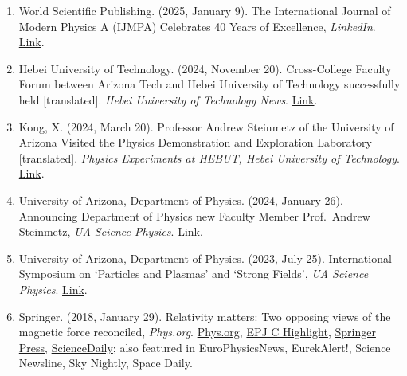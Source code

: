 \documentclass[11pt]{article}
\begin{document}
\begin{enumerate}[leftmargin=*,nosep]
  \item World Scientific Publishing. (2025, January 9). The International Journal of Modern Physics A (IJMPA) Celebrates 40 Years of Excellence, \textit{LinkedIn}. \href{https://www.linkedin.com/posts/world-scientific-publishing_the-international-journal-of-modern-physics-activity-7282999555967610880-SJ78}{Link}.
  \item Hebei University of Technology. (2024, November 20). Cross-College Faculty Forum between Arizona Tech and Hebei University of Technology successfully held [translated]. \textit{Hebei University of Technology News}. \href{https://web.archive.org/web/20250628230434/https://hatech.hebut.edu.cn/xw/62ff3dcc665b453898ec92841d45e0ce.htm}{Link}.
  \item Kong, X. (2024, March 20). Professor Andrew Steinmetz of the University of Arizona Visited the Physics Demonstration and Exploration Laboratory [translated]. \textit{Physics Experiments at HEBUT, Hebei University of Technology}. \href{https://web.archive.org/web/20250629152037/https://mp.weixin.qq.com/s?__biz=Mzg4Njg3NjQyMw==&mid=2247484302&idx=1&sn=273f88bc0332d9a34a9fdbee01b196b3&chksm=cf93b3e6f8e43af0b75b832801bbe9e684d258f00c3671e7e625bfccde7c74a387ef9e5a9926&mpshare=1&scene=24&srcid=0320Wt3iZMGOxbLpRBZg9nYA}{Link}.
  \item University of Arizona, Department of Physics. (2024, January 26). Announcing Department of Physics new Faculty Member Prof.\ Andrew Steinmetz, \textit{UA Science Physics}. \href{https://w3.physics.arizona.edu/news/announcing-department-physics-new-faculty-member-prof-andrew-steinmetz}{Link}.
  \item University of Arizona, Department of Physics. (2023, July 25). International Symposium on ‘Particles and Plasmas’ and ‘Strong Fields’, \textit{UA Science Physics}. \href{https://w3.physics.arizona.edu/news/international-symposium-particles-and-plasmas-and-strong-fields}{Link}.
  \item Springer. (2018, January 29). Relativity matters: Two opposing views of the magnetic force reconciled, \textit{Phys.org}. \href{https://phys.org/news/2018-01-relativity-opposing-views-magnetic.html}{Phys.org}, \href{https://www.epj.org/epjc-news/1422-epjc-highlight-relativity-matters-two-opposing-views-of-the-magnetic-force-reconciled}{EPJ C Highlight}, \href{https://www.springer.com/gp/about-springer/media/research-news/all-english-research-news/relativity-matters--two-opposing-views-of-the-magnetic-force-reconciled/15417658}{Springer Press}, \href{https://www.sciencedaily.com/releases/2018/01/180129131327.htm}{ScienceDaily}; also featured in EuroPhysicsNews, EurekAlert!, Science Newsline, Sky Nightly, Space Daily.
\end{enumerate}
\end{document}
